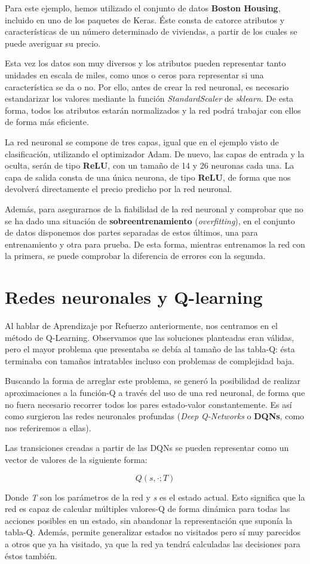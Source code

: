 Para este ejemplo, hemos utilizado el conjunto de datos \textbf{Boston Housing}, incluido en uno de los paquetes de Keras. Éste consta de catorce atributos y características de un número determinado de viviendas, a partir de los cuales se puede averiguar su precio. 

Esta vez los datos son muy diversos y los atributos pueden representar tanto unidades en escala de miles, como unos o ceros para representar si una característica se da o no. Por ello, antes de crear la red neuronal, es necesario estandarizar los valores mediante la función \textit{StandardScaler} de \textit{sklearn}. De esta forma, todos los atributos estarán normalizados y la red podrá trabajar con ellos de forma más eficiente.

La red neuronal se compone de tres capas, igual que en el ejemplo visto de clasificación, utilizando el optimizador Adam. De nuevo, las capas de entrada y la oculta, serán de tipo \textbf{ReLU}, con un tamaño de 14 y 26 neuronas cada una. La capa de salida consta de una única neurona, de tipo \textbf{ReLU}, de forma que nos devolverá directamente el precio predicho por la red neuronal. 

Además, para asegurarnos de la fiabilidad de la red neuronal y comprobar que no se ha dado una situación de \textbf{sobreentrenamiento} (\textit{overfitting}), en el conjunto de datos disponemos dos partes separadas de estos últimos, una para entrenamiento y otra para prueba. De esta forma, mientras entrenamos la red con la primera, se puede comprobar la diferencia de errores con la segunda. 


\section{Redes neuronales y Q-learning}

Al hablar de Aprendizaje por Refuerzo anteriormente, nos centramos en el método de Q-Learning. Observamos que las soluciones planteadas eran válidas, pero el mayor problema que presentaba se debía al tamaño de las tabla-Q: ésta terminaba con tamaños intratables incluso con problemas de complejidad baja. 

Buscando la forma de arreglar este problema, se generó la posibilidad de realizar aproximaciones a la función-Q a través del uso de una red neuronal, de forma que no fuera necesario recorrer todos los pares estado-valor constantemente. Es así como surgieron las redes neuronales profundas (\textit{Deep Q-Networks} o \textbf{DQNs}, como nos referiremos a ellas). 

Las transiciones creadas a partir de las DQNs se pueden representar como un vector de valores de la siguiente forma: 

$$Q(s, · ; T )$$ 

Donde \textit{T} son los parámetros de la red y \textit{s} es el estado actual. Esto significa que la red es capaz de calcular múltiples valores-Q de forma dinámica para todas las acciones posibles en un estado, sin abandonar la representación que suponía la tabla-Q. Además, permite generalizar estados no visitados pero sí muy parecidos a otros que ya ha visitado, ya que la red ya tendrá calculadas las decisiones para éstos también.
